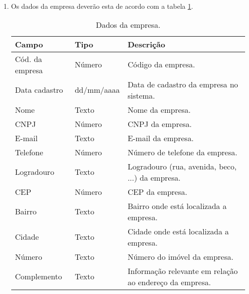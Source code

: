 \begin{enumerate}[label=ED\arabic*]
	\item Os dados da empresa deverão esta de acordo com a tabela \ref{uc014_tb_rn1}. \label{uc014_ed:1}
	\begin{table}[htb]
		\ABNTEXfontereduzida
		\caption[Dados da empresa]{Dados da empresa.}
		\label{uc014_tb_rn1}
		\begin{tabular}{|p{4.0cm}|p{3.0cm}|p{7.25cm}|}
			\hline
			\textbf{Campo}  & \textbf{Tipo} & \textbf{Descrição}                                      \\ \hline
			Cód. da empresa & Número        & Código da empresa.                                      \\ \hline
			Data cadastro   & dd/mm/aaaa    & Data de cadastro da empresa no sistema.                 \\ \hline
			Nome            & Texto         & Nome da empresa.                                        \\ \hline
			CNPJ            & Número        & CNPJ da empresa.                                        \\ \hline
			E-mail          & Texto         & E-mail da empresa.                                      \\ \hline
			Telefone        & Número        & Número de telefone da empresa.                          \\ \hline
			Logradouro      & Texto         & Logradouro (rua, avenida, beco, ...) da empresa.        \\ \hline
			CEP             & Número        & CEP da empresa.                           \\ \hline
			Bairro          & Texto         & Bairro onde está localizada a empresa.                  \\ \hline
			Cidade          & Texto         & Cidade onde está localizada a empresa.                  \\ \hline
			Número          & Texto         & Número do imóvel da empresa.                            \\ \hline
			Complemento     & Texto         & Informação relevante em relação ao endereço da empresa. \\ \hline
		\end{tabular}
	\end{table}
\end{enumerate}